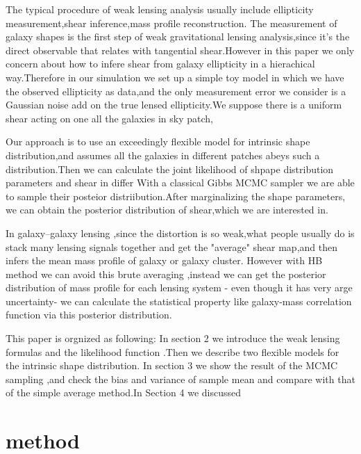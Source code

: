 \documentclass[useAMS,usenatbib]{mn2e}
\begin{document}
The typical procedure of weak lensing analysis usually include ellipticity measurement,shear inference,mass profile reconstruction.
The measurement of galaxy shapes  is  the first step  of weak gravitational lensing analysis,since it's the direct observable
that relates with tangential shear.However in this paper we only concern about how to infere shear from galaxy ellipticity
in a hierachical way.Therefore in our simulation we set up a simple toy model in which we have the observed ellipticity as data,and the only measurement error we consider 
is a Gaussian noise add on the true lensed ellipticity.We suppose there is a uniform shear acting on one all the galaxies in sky patch,


Our approach is to use an exceedingly flexible model for intrinsic shape distribution,and assumes all the galaxies in different
patches abeys such a distribution.Then we can calculate the joint likelihood of  shpape distribution parameters and shear in differ
With a classical Gibbs MCMC sampler we are able to sample their posteior distriibution.After marginalizing the shape parameters, we can
obtain the posterior distribution of shear,which we are interested in.


In galaxy--galaxy lensing ,since the distortion is so weak,what people usually do is stack many lensing signals together and get the "average"
shear map,and then infers the mean mass profile of galaxy or galaxy cluster.
However with HB method we can avoid this brute averaging ,instead we can get the posterior distribution of mass profile for 
each lensing system - even though it has very arge uncertainty- we can calculate the statistical property like galaxy-mass
correlation function via this posterior distribution.


This paper is orgnized as following: In section 2 we introduce the weak lensing formulas and the likelihood function .Then we 
describe two flexible models for the intrinsic shape distribution. In section 3 we show the result of the MCMC sampling
,and check the bias and variance of sample mean and compare with that of the simple average method.In Section 4 we discussed





\section{method}
\label{sec:XXX}
\end{document}
